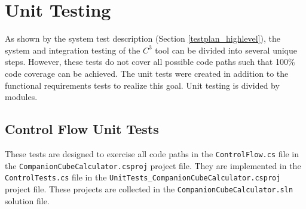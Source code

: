 \documentclass[12pt, titlepage]{article}
\newcommand{\prognameAbbrv}{$C^{3}$}
\begin{document}
\newpage				
				
\section{Unit Testing}
		
As shown by the system test description (Section \ref{testplan_highlevel}), the 
system and integration testing of the \prognameAbbrv{} tool can be divided into 
several unique steps. However, these tests do not cover all possible code paths 
such that 100\% code coverage can be achieved. The unit tests were created in 
addition to the functional requirements tests to realize this goal. Unit 
testing is divided by modules.

\subsection{Control Flow Unit Tests}
These tests are designed to exercise all code paths in the 
\texttt{ControlFlow.cs} file in the \texttt{CompanionCubeCalculator.csproj} 
project file. They are implemented in the \texttt{ControlTests.cs} file in the 
\texttt{UnitTests\_CompanionCubeCalculator.csproj} project file. These projects 
are collected in the \texttt{CompanionCubeCalculator.sln} solution file.
\end{document}

